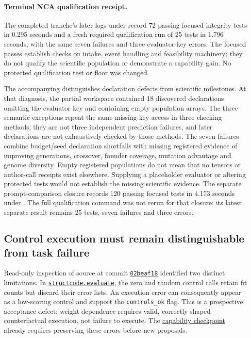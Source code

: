 \documentclass[11pt]{article}
\begin{document}
\paragraph{Terminal NCA qualification receipt.}
The completed tranche's later logs under
 record 72 passing focused integrity
tests in 0.295 seconds and a fresh required qualification run of 25 tests in
1.796 seconds, with the same seven failures and three evaluator-key errors.
The focused passes establish checks on intake, event handling and feasibility
machinery; they do not qualify the scientific population or demonstrate a
capability gain. No protected qualification test or floor was changed.

The accompanying 
distinguishes declaration defects from scientific milestones. At that diagnosis,
the partial workspace contained 18 discovered declarations omitting the evaluator
key and containing empty population arrays. The three semantic exceptions repeat the same missing-key
access in three checking methods; they are not three independent prediction
failures, and later declarations are not exhaustively checked by those methods.
The seven failures combine budget/seed declaration shortfalls with missing
registered evidence of improving generations, crossover, founder coverage,
mutation advantage and genome diversity. Empty registered populations do not
mean that no tensors or author-call receipts exist elsewhere. Supplying a
placeholder evaluator or altering protected tests would not establish the
missing scientific evidence. The separate prompt-comparison closure records
120 passing focused tests in 4.173 seconds under
.
The full qualification command was not rerun for that closure: its latest
separate result remains 25 tests, seven failures and three errors.

\subsection{Control execution must remain distinguishable from task failure}\label{sec:controlintegrity}
Read-only inspection of source at commit
\href{https://github.com/Sanokei/CellForge/tree/02beaf18251fca5ed1f1eb55e92f00a3e3820e88}{\texttt{02beaf18}}
identified two distinct limitations. In
\href{https://github.com/Sanokei/CellForge/blob/02beaf18251fca5ed1f1eb55e92f00a3e3820e88/scripts/structcode.py#L248-L270}{\texttt{structcode.evaluate}},
the zero and random control calls retain fit counts but discard their error lists.
An execution error can consequently appear as a low-scoring control and support the
\texttt{controls\_ok} flag. This is a prospective acceptance defect: weight dependence
requires valid, correctly shaped counterfactual execution, not failure to execute.
The \href{https://github.com/Sanokei/CellForge/blob/02beaf18251fca5ed1f1eb55e92f00a3e3820e88/reports/CAPABILITY_WEIGHTS_CHECKPOINT_20261006.md}{capability checkpoint}
already requires preserving these errors before new proposals.
\end{document}
